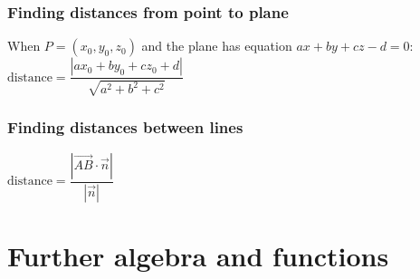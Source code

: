 \documentclass[A4paper]{article}
\begin{document}
	\subsubsection{Finding distances from point to plane}
	When $P=(x_0,y_0,z_0)$ and the plane has equation $ax+by+cz-d=0$:
	\begin{math}\text{distance}=\dfrac{|ax_0+by_0+cz_0+d|}{\sqrt{a^2+b^2+c^2}}\end{math}
	\subsubsection{Finding distances between lines}
	$\text{distance}=\dfrac{|\overrightarrow{AB}\cdot\vec{n}|}{|\vec{n}|}$


	\pagebreak

	\section{Further algebra and functions}

	\pagebreak
\end{document}
